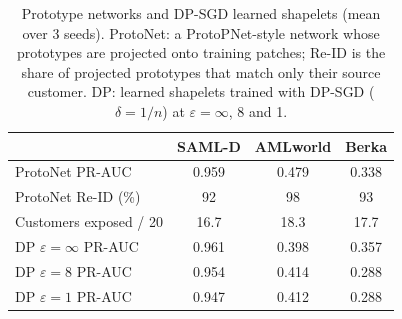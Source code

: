 \begin{table}[H]
\caption{Prototype networks and DP-SGD learned shapelets (mean over 3 seeds). ProtoNet: a ProtoPNet-style network whose prototypes are projected onto training patches; Re-ID is the share of projected prototypes that match only their source customer. DP: learned shapelets trained with DP-SGD ($\delta = 1/n$) at $\varepsilon = \infty$, 8 and 1.}
\label{tab:proto}
\small\setlength{\tabcolsep}{2.5pt}
\centering
\begin{tabular}{lccc}
\toprule
& SAML-D & AMLworld & Berka \\
\midrule
ProtoNet PR-AUC & 0.959 & 0.479 & 0.338 \\
ProtoNet Re-ID (\%) & 92 & 98 & 93 \\
Customers exposed / 20 & 16.7 & 18.3 & 17.7 \\
\midrule
DP $\varepsilon=\infty$ PR-AUC & 0.961 & 0.398 & 0.357 \\
DP $\varepsilon=8$ PR-AUC & 0.954 & 0.414 & 0.288 \\
DP $\varepsilon=1$ PR-AUC & 0.947 & 0.412 & 0.288 \\
\bottomrule\end{tabular}\end{table}
